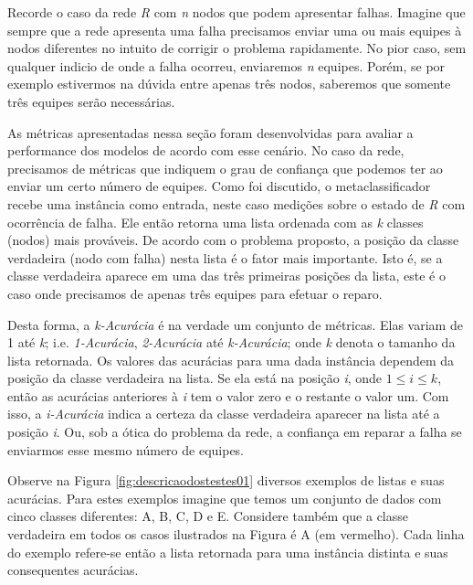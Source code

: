 Recorde o caso da rede \textit{R} com \textit{n} nodos que podem apresentar falhas.
Imagine que sempre que a rede apresenta uma falha precisamos enviar uma ou mais equipes à nodos diferentes no intuito de corrigir o problema rapidamente.
No pior caso, sem qualquer indicio de onde a falha ocorreu, enviaremos \textit{n} equipes.
Porém, se por exemplo estivermos na dúvida entre apenas três nodos, saberemos que somente três equipes serão necessárias.

As métricas apresentadas nessa seção foram desenvolvidas para avaliar a performance dos modelos de acordo com esse cenário.
No caso da rede, precisamos de métricas que indiquem o grau de confiança que podemos ter ao enviar um certo número de equipes.
Como foi discutido, o metaclassificador recebe uma instância como entrada, neste caso medições sobre o estado de \textit{R} com ocorrência de falha.
Ele então retorna uma lista ordenada com as \textit{k} classes (nodos) mais prováveis.
De acordo com o problema proposto, a posição da classe verdadeira (nodo com falha) nesta lista é o fator mais importante.
Isto é, se a classe verdadeira aparece em uma das três primeiras posições da lista, este é o caso onde precisamos de apenas três equipes para efetuar o reparo.

Desta forma, a \textit{k-Acurácia} é na verdade um conjunto de métricas.
Elas variam de 1 até \textit{k}; i.e. \textit{1-Acurácia}, \textit{2-Acurácia} até \textit{k-Acurácia}; onde \textit{k} denota o tamanho da lista retornada.
Os valores das acurácias para uma dada instância dependem da posição da classe verdadeira na lista.
Se ela está na posição \textit{i}, onde $1 \leq \textit{i} \leq \textit{k}$, então as acurácias anteriores à \textit{i} tem o valor zero e o restante o valor um.
Com isso, a \textit{i-Acurácia} indica a certeza da classe verdadeira aparecer na lista até a posição \textit{i}.
Ou, sob a ótica do problema da rede, a confiança em reparar a falha se enviarmos esse mesmo número de equipes.

Observe na Figura \ref{fig:descricaodostestes01} diversos exemplos de listas e suas acurácias.
Para estes exemplos imagine que temos um conjunto de dados com cinco classes diferentes: A, B, C, D e E.
Considere também que a classe verdadeira em todos os casos ilustrados na Figura é A (em vermelho).
Cada linha do exemplo refere-se então a lista retornada para uma instância distinta e suas consequentes acurácias.

